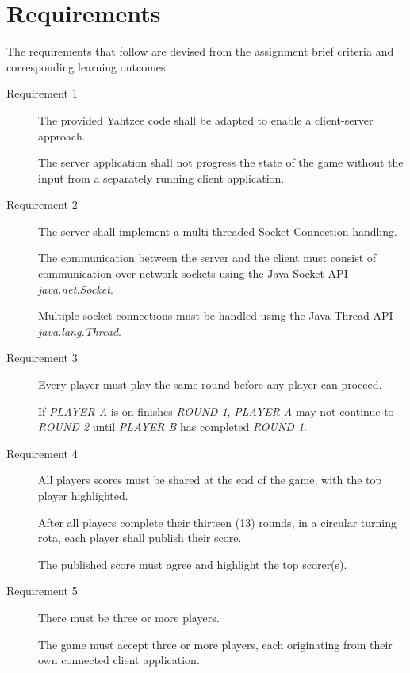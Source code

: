 \section{Requirements}


The requirements that follow are devised from the assignment brief criteria and corresponding learning outcomes.

\begin{description}
	\item [Requirement 1] The provided Yahtzee code shall be adapted to enable a client-server approach.
	
	The server application shall not progress the state of the game without the input from a separately running client application.
	
	\item [Requirement 2] The server shall implement a multi-threaded Socket Connection handling.
	
	The communication between the server and the client must consist of communication over network sockets using the Java Socket API \textit{java.net.Socket}.
	
	Multiple socket connections must be handled using the Java Thread API \textit{java.lang.Thread}.
		
	\item   [Requirement 3] Every player must play the same round before any player can proceed. 
	 
	 If \textit{PLAYER A} is on finishes \textit{ROUND 1}, \textit{PLAYER A} may not continue to \textit{ROUND 2} until \textit{PLAYER B} has completed \textit{ROUND 1}.
	
	\item  [Requirement 4] All players scores must be shared at the end of the game, with the top
	player highlighted.
	
	After all players complete their thirteen (13) rounds, in a circular turning rota, each player shall publish their score.
	
	The published score must agree and highlight the top scorer(s).	
	
	\item  [Requirement 5] There must be three or more players. 
	
	The game must accept three or more players, each originating from their own connected client application.
	

\end{description}
